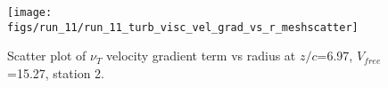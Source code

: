 \begin{figure}[H]
\centering
\texttt{[image: figs/run\_11/run\_11\_turb\_visc\_vel\_grad\_vs\_r\_meshscatter]}
\caption{Scatter plot of $\nu_T$ velocity gradient term vs radius at $z/c$=6.97, $V_{free}$=15.27, station 2.}
\label{fig:run_11_turb_visc_vel_grad_vs_r_meshscatter}
\end{figure}


